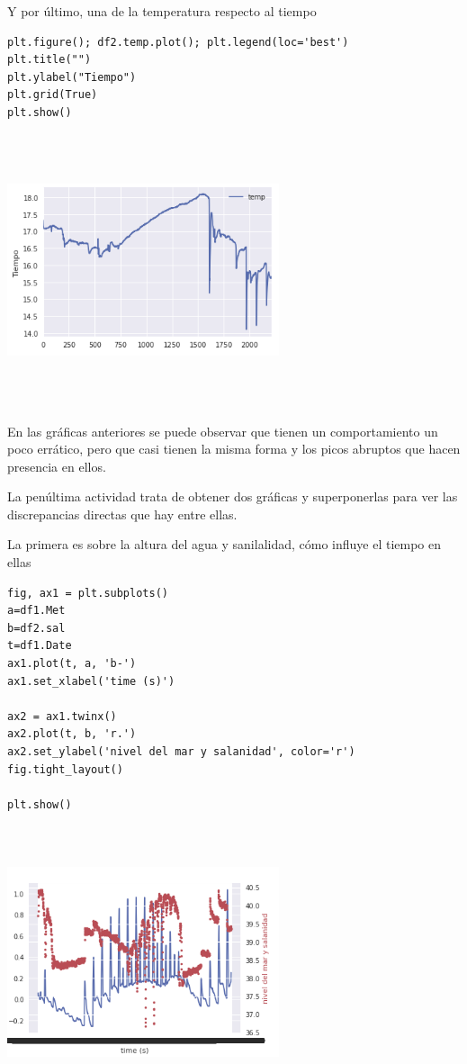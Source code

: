 \documentclass{article}
\begin{document}
Y por último, una de la temperatura respecto al tiempo

\begin{verbatim}
plt.figure(); df2.temp.plot(); plt.legend(loc='best')
plt.title("")
plt.ylabel("Tiempo")
plt.grid(True)
plt.show()
\end{verbatim}

\begin{center}

\includegraphics[width=8cm, height=8cm]{graf3.png}
\end{center}

En las gráficas anteriores se puede observar que tienen un comportamiento un poco errático, pero que casi tienen la misma forma y los picos abruptos que hacen presencia en ellos.

La penúltima actividad trata de obtener dos gráficas y superponerlas para ver las discrepancias directas que hay entre ellas.

La primera es sobre la altura del agua y sanilalidad, cómo influye el tiempo en ellas


\begin{verbatim}
fig, ax1 = plt.subplots()
a=df1.Met
b=df2.sal
t=df1.Date
ax1.plot(t, a, 'b-')
ax1.set_xlabel('time (s)')

ax2 = ax1.twinx()
ax2.plot(t, b, 'r.')
ax2.set_ylabel('nivel del mar y salanidad', color='r')
fig.tight_layout()

plt.show()
\end{verbatim}


\begin{center}

\includegraphics[width=8cm, height=8cm]{two1.png}
\end{center}
\end{document}
